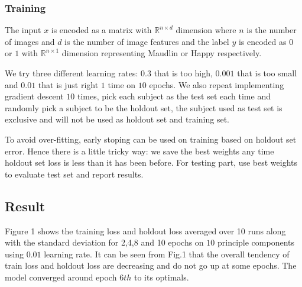 \documentclass{article}
\begin{document}
\subsubsection{Training}

The input $x$ is encoded as a matrix with $\mathbb{R}^{n\times d}$ dimension where $n$ is the number of images and $d$ is the number of image features and the label $y$ is encoded as $0$ or $1$ with $\mathbb{R}^{n\times 1}$ dimension representing Maudlin or Happy respectively.

We try three different learning rates: $0.3$ that is too high, $0.001$ that is too small and $0.01$ that is just right $1$ time on $10$ epochs. We also repeat implementing gradient descent $10$ times, pick each subject as the test set each time and randomly pick a subject to be the holdout set, the subject used as test set is exclusive and will not be used as holdout set and training set.

To avoid over-fitting, early stoping can be used on training based on holdout set error. Hence there is a little tricky way: we save the best weights any time holdout set loss is less than it has been before. For testing part, use best weights to evaluate test set and report results.

\subsection{Result}

Figure 1 shows the training loss and holdout loss averaged over 10 runs along with the standard deviation for 2,4,8 and 10 epochs on $10$ principle components using $0.01$ learning rate. It can be seen from Fig.1 that the overall tendency of train loss and holdout loss are decreasing and do not go up at some epochs. The model converged around epoch $6th$ to its optimals.
\end{document}
